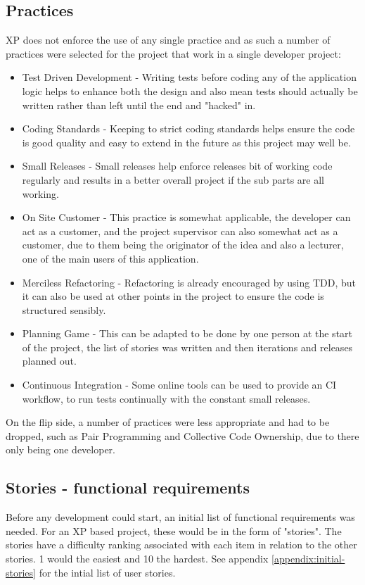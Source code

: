 \subsection{Practices}
XP does not enforce the use of any single practice and as such a number of practices were selected for the project that work in a single developer project:
\begin{itemize}
	\item Test Driven Development - Writing tests before coding any of the application logic helps to enhance both the design and also mean tests should actually be written rather than left until the end and "hacked" in.
	\item Coding Standards - Keeping to strict coding standards helps ensure the code is good quality and easy to extend in the future as this project may well be.
	\item Small Releases - Small releases help enforce releases bit of working code regularly and results in a better overall project if the sub parts are all working.
	\item On Site Customer - This practice is somewhat applicable, the developer can act as a customer, and the project supervisor can also somewhat act as a customer, due to them being the originator of the idea and also a lecturer, one of the main users of this application.
	\item Merciless Refactoring - Refactoring is already encouraged by using TDD, but it can also be used at other points in the project to ensure the code is structured sensibly.
	\item Planning Game - This can be adapted to be done by one person at the start of the project, the list of stories was written and then iterations and releases planned out.
	\item Continuous Integration - Some online tools can be used to provide an CI workflow, to run tests continually with the constant small releases.
\end{itemize}

On the flip side, a number of practices were less appropriate and had to be dropped, such as Pair Programming and Collective Code Ownership, due to there only being one developer.

\subsection{Stories - functional requirements}
Before any development could start, an initial list of functional requirements was needed. For an XP based project, these would be in the form of "stories". The stories have a difficulty ranking associated with each item in relation to the other stories. 1 would the easiest and 10 the hardest. See appendix \ref{appendix:initial-stories} for the intial list of user stories.

